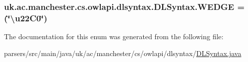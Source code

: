 \hypertarget{enumuk_1_1ac_1_1manchester_1_1cs_1_1owlapi_1_1dlsyntax_1_1_d_l_syntax_a7022deae13bfd98e5bb3b95d1c262340}{
\subsubsection[{W\-E\-D\-G\-E}]{\setlength{\rightskip}{0pt plus 5cm}uk.\-ac.\-manchester.\-cs.\-owlapi.\-dlsyntax.\-D\-L\-Syntax.\-W\-E\-D\-G\-E =(\char`\"{}\textbackslash{}u22\-C0\char`\"{})}}\label{enumuk_1_1ac_1_1manchester_1_1cs_1_1owlapi_1_1dlsyntax_1_1_d_l_syntax_a7022deae13bfd98e5bb3b95d1c262340}


The documentation for this enum was generated from the following file\-:\begin{DoxyCompactItemize}
\item 
parsers/src/main/java/uk/ac/manchester/cs/owlapi/dlsyntax/\hyperlink{_d_l_syntax_8java}{D\-L\-Syntax.\-java}\end{DoxyCompactItemize}
